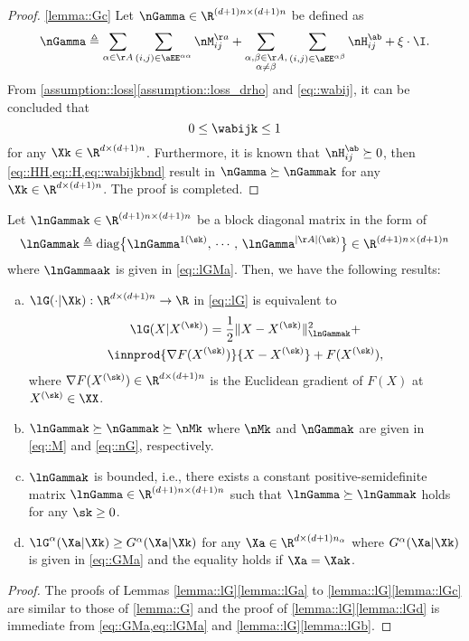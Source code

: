 \begin{proof}
\ref{lemma::Gc} Let $\nGamma\in\R^{(d+1)n\times(d+1)n}$ be defined as
\begin{equation}\label{eq::HH}
	\nGamma\triangleq\sum_{\alpha\in\AA}\sum_{(i,j)\in \aEE^{\alpha\alpha}}\nM_{ij}^{\aa}+
	\sum_{\substack{\alpha,\beta\in\AA,\\\alpha\neq \beta}}\sum_{(i,j)\in \aEE^{\alpha\beta}} \nH_{ij}^{\ab}+\xi\cdot\I.
\end{equation}
From \cref{assumption::loss}\ref{assumption::loss_drho} and \cref{eq::wabij}, it can be concluded that
\begin{equation}\label{eq::wabijkbnd}
	0\leq \wabijk \leq 1
\end{equation} 
for any $\Xk\in\R^{d\times(d+1)n}$. Furthermore, it is known that $\nH_{ij}^{\ab} \succeq 0$, then \cref{eq::HH,eq::H,eq::wabijkbnd} result in $\nGamma\succeq\nGammak$ for any $\Xk\in\R^{d\times(d+1)n}$. The proof is completed.
\end{proof}
 
 
 \begin{lemma}\label{lemma::lG}
	Let  $\lnGammak \in \R^{(d+1)n\times (d+1)n}$ be a block diagonal matrix in the form of
	\begin{equation}\label{eq::lnG}
		\lnGammak\triangleq\mathrm{diag}\big\{\lnGamma^{1(\sk)},\,\cdots,\,\lnGamma^{|\AA|(\sk)}\big\}\in \R^{(d+1)n\times (d+1)n}
	\end{equation}
	where $\lnGammaak$ is given in \cref{eq::lGMa}. Then, we have the following results:
	\begin{enumerate}[(a)]
		\item\label{lemma::lGa} $\lG(\cdot|\Xk): \R^{d\times(d+1)n}\rightarrow\R$ in \cref{eq::lG}  is equivalent to
		\begin{multline}\label{eq::lGM}
			\lG(X|X^{(\sk)})
			=\frac{1}{2}\|X-X^{(\sk)}\|_{\lnGammak}^2+\\
			\innprod{\nabla F(X^{(\sk)})}{{X-X^{(\sk)}}}+ F(X^{(\sk)}),
		\end{multline}
		where  $\nabla F(X^{(\sk)})\in \R^{d\times(d+1)n}$ is the Euclidean gradient of $F(X)$ at $X^{(\sk)}\in\XX$.
		\item\label{lemma::lGb} $\lnGammak\succeq\nGammak\succeq\nMk$ where $\nMk$ and $\nGammak$ are given in \cref{eq::M} and \cref{eq::nG}, respectively. 
		\item\label{lemma::lGc}$\lnGammak$ is bounded, i.e.,  there exists a constant positive-semidefinite matrix $\lnGamma\in \R^{(d+1)n\times (d+1)n}$ such that $\lnGamma\succeq \lnGammak$ holds for any $\sk\geq 0$.
		\item\label{lemma::lGd} $\lG^\alpha(\Xa|\Xk)\geq G^\alpha(\Xa|\Xk)$ for any $\Xa\in\R^{d\times (d+1)n_\alpha}$ where $G^\alpha(\Xa|\Xk)$ is given in \cref{eq::GMa} and the equality holds if  $\Xa=\Xak$.
	\end{enumerate}
\end{lemma}
 \begin{proof}
 The proofs of Lemmas \ref{lemma::lG}\ref{lemma::lGa} to \ref{lemma::lG}\ref{lemma::lGc}  are similar to those of \cref{lemma::G} and the proof of  \cref{lemma::lG}\ref{lemma::lGd} is  immediate from \cref{eq::GMa,eq::lGMa} and \cref{lemma::lG}\ref{lemma::lGb}.
 \end{proof}
 
